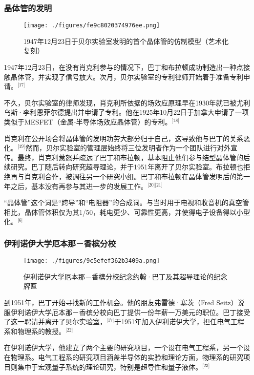 \subsubsection{晶体管的发明}
\begin{figure}[ht]
\centering
\texttt{[image: ./figures/fe9c8020374976ee.png]}
\caption{1947年12月23日于贝尔实验室发明的首个晶体管的仿制模型（艺术化复刻）} \label{fig_Yhbd_3}
\end{figure}
1947年12月23日，在没有肖克利参与的情况下，巴丁和布拉顿成功制造出一种点接触晶体管，并实现了信号放大。次月，贝尔实验室的专利律师开始着手准备专利申请。\(^\text{[17]}\)

不久，贝尔实验室的律师发现，肖克利所依据的场效应原理早在1930年就已被尤利乌斯·李利恩菲尔德提出并申请了专利。他在1925年10月22日于加拿大申请了一项类似于MESFET（金属-半导体场效应晶体管）的专利。\(^\text{[18]}\)

肖克利在公开场合将晶体管的发明功劳大部分归于自己，这导致他与巴丁的关系恶化。\(^\text{[19]}\)然而，贝尔实验室的管理层始终将三位发明者作为一个团队进行对外宣传。最终，肖克利惹怒并疏远了巴丁和布拉顿，基本阻止他们参与结型晶体管的后续研究。巴丁随后转向研究超导理论，并于1951年离开了贝尔实验室。布拉顿也拒绝再与肖克利合作，被调往另一个研究小组。巴丁和布拉顿在晶体管发明后的第一年之后，基本没有再参与其进一步的发展工作。\(^\text{[20][21]}\)

“晶体管”这个词是“跨导”和“电阻器”的合成词。与当时用于电视和收音机的真空管相比，晶体管体积仅为其1/50，耗电更少、可靠性更高，并使得电子设备得以小型化。\(^\text{[6]}\)
\subsubsection{伊利诺伊大学厄本那－香槟分校}
\begin{figure}[ht]
\centering
\texttt{[image: ./figures/9c5efef362b3409a.png]}
\caption{伊利诺伊大学厄本那－香槟分校纪念约翰·巴丁及其超导理论的纪念牌匾} \label{fig_Yhbd_4}
\end{figure}
到1951年，巴丁开始寻找新的工作机会。他的朋友弗雷德·塞茨（Fred Seitz）说服伊利诺伊大学厄本那－香槟分校向巴丁提供一份年薪一万美元的职位。巴丁接受了这一聘请并离开了贝尔实验室，\(^\text{[17]}\)于1951年加入伊利诺伊大学，担任电气工程系和物理系的教授。\(^\text{[22]}\)

在伊利诺伊大学，他建立了两个主要的研究项目，一个设在电气工程系，另一个设在物理系。电气工程系的研究项目涵盖半导体的实验和理论方面，物理系的研究项目则集中于宏观量子系统的理论研究，特别是超导性和量子液体。\(^\text{[23]}\)

